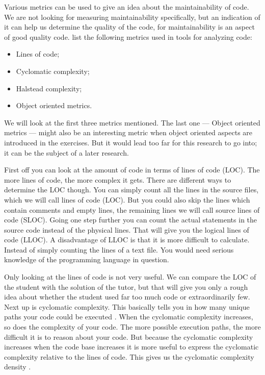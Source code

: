 \documentclass{article}
\begin{document}
Various metrics can be used to give an idea about the maintainability of
code. We are not looking for measuring maintainability specifically, but an
indication of it can help us determine the quality of the code, for
maintainability is an aspect of good quality code. \citet{rakic2013problems}
list the following metrics used in tools for analyzing code:
\begin{itemize}
  \item Lines of code;
  \item Cyclomatic complexity;
  \item Halstead complexity;
  \item Object oriented metrics.
\end{itemize}
We will look at the first three metrics mentioned. The last one --- Object
oriented metrics --- might also be an interesting metric when object oriented
aspects are introduced in the exercises. But it would lead too far for this
research to go into; it can be the subject of a later research.

First off you can look at the amount of code in terms of lines of code
(LOC). The more lines of code, the more complex it gets. There are different
ways to determine the LOC though. You can simply count all the lines in the
source files, which we will call lines of code (LOC). But you could also skip
the lines which contain comments and empty lines, the remaining lines we will
call source lines of code (SLOC). Going one step further you can count the
actual statements in the source code instead of the physical lines. That will
give you the logical lines of code (LLOC). A disadvantage of LLOC is that it is
more difficult to calculate. Instead of simply counting the lines of a text
file. You would need serious knowledge of the programming language in question.

Only looking at the lines of code is not very useful. We can compare the LOC of
the student with the solution of the tutor, but that will give you only a
rough idea about whether the student used far too much code or extraordinarily
few. Next up is cyclomatic complexity. This basically tells you in how many
unique paths your code could be executed \citep{website:js-complexity}. When
the cyclomatic complexity increases, so does the complexity of your code. The
more possible execution paths, the more difficult it is to reason about your
code. But because the cyclomatic complexity increases when the code base
increases it is more useful to express the cyclomatic complexity relative to
the lines of code. This gives us the cyclomatic complexity density
\citep{gill1991cyclomatic}.
\end{document}

